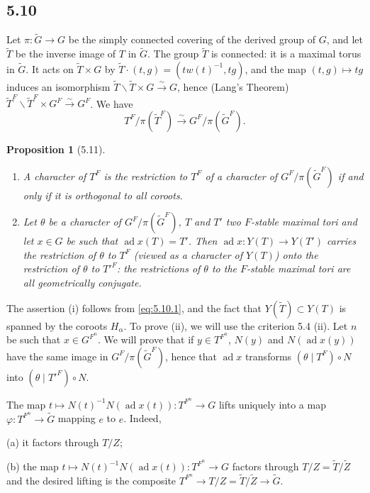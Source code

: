 \documentclass[11pt]{amsart}
\theoremstyle{plain}
\newtheorem{proposition}[theorem]{Proposition}
\theoremstyle{remark}
\DeclareMathOperator{\ad}{ad}
\begin{document}
\subsection{5.10} Let $\pi: \tilde{G} \to G$ be the simply connected covering of the derived group of $G$, and let $\tilde{T}$ be the inverse image of $T$ in $\tilde{G}$. The group $\tilde{T}$ is connected: it is a maximal torus in $\tilde{G}$. It acts on $\tilde{T} \times G$ by $\tilde{T} \cdot (t, g) = (tw(t)^{-1}, tg)$, and the map $(t, g) \mapsto tg$ induces an isomorphism $\tilde{T}\backslash \tilde{T} \times G \xrightarrow{\sim} G$, hence (Lang's Theorem) $\tilde{T}^F\backslash \tilde{T}^F \times G^F \xrightarrow{\sim} G^F$. We have
\begin{equation}\label{eq:5.10.1}
T^F/\pi(\tilde{T}^F) \xrightarrow{\sim} G^F/\pi(\tilde{G}^F).
\end{equation}

\begin{proposition}[5.11]
\begin{enumerate}
\item[(i)] A character of $T^F$ is the restriction to $T^F$ of a character of $G^F/\pi(\tilde{G}^F)$ if and only if it is orthogonal to all coroots.
\item[(ii)] Let $\theta$ be a character of $G^F/\pi(\tilde{G}^F)$, $T$ and $T'$ two $F$-stable maximal tori and let $x \in G$ be such that $\ad x(T) = T'$. Then $\ad x: Y(T) \to Y(T')$ carries the restriction of $\theta$ to $T^F$ (viewed as a character of $Y(T)$) onto the restriction of $\theta$ to $T'^F$: the restrictions of $\theta$ to the $F$-stable maximal tori are all geometrically conjugate.
\end{enumerate}
\end{proposition}

The assertion (i) follows from \eqref{eq:5.10.1}, and the fact that $Y(\tilde{T}) \subset Y(T)$ is spanned by the coroots $H_\alpha$. To prove (ii), we will use the criterion 5.4 (ii). Let $n$ be such that $x \in G^{F^n}$. We will prove that if $y \in T^{F^n}$, $N(y)$ and $N(\ad x(y))$ have the same image in $G^F/\pi(\tilde{G}^F)$, hence that $\ad x$ transforms $(\theta \mid T^F) \circ N$ into $(\theta \mid T'^F) \circ N$.

The map $t \mapsto N(t)^{-1}N(\ad x(t)): T^{F^n} \to G$ lifts uniquely into a map $\varphi: T^{F^n} \to \tilde{G}$ mapping $e$ to $e$. Indeed,

(a) it factors through $T/Z$;

(b) the map $t \mapsto N(t)^{-1}N(\ad x(t)): T^{F^n} \to G$ factors through $T/Z = \tilde{T}/\tilde{Z}$ and the desired lifting is the composite $T^{F^n} \to T/Z = \tilde{T}/\tilde{Z} \to \tilde{G}$.
\end{document}

